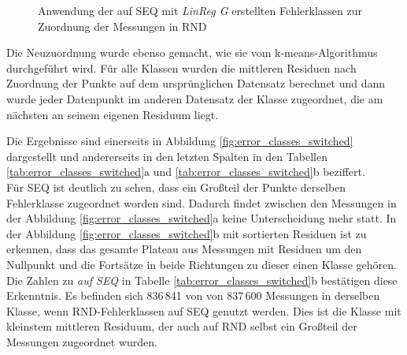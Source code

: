 \documentclass[
	12pt,
	a4paper,
	BCOR10mm,
	DIV14,
	listof=totoc,
	bibliography=totoc,
	headsepline
]{scrreprt}
\begin{document}
\begin{figure}
	\begin{center}
		\caption{Anwendung der auf SEQ mit \textit{LinReg G} erstellten Fehlerklassen zur Zuordnung der Messungen in RND}
		\label{fig:switched_classificators}
	\end{center}
\end{figure} 

Die Neuzuordnung wurde ebenso gemacht, wie sie vom k-means-Algorithmus durchgeführt wird.
Für alle Klassen wurden die mittleren Residuen nach Zuordnung der Punkte auf dem ursprünglichen Datensatz berechnet und dann wurde jeder Datenpunkt im anderen Datensatz der Klasse zugeordnet, die am nächsten an seinem eigenen Residuum liegt.\medskip

Die Ergebnisse sind einerseits in Abbildung \ref{fig:error_classes_switched} dargestellt und andererseits in den letzten Spalten in den Tabellen \ref{tab:error_classes_switched}a und \ref{tab:error_classes_switched}b beziffert.\\
Für SEQ ist deutlich zu sehen, dass ein Großteil der Punkte derselben Fehlerklasse zugeordnet worden sind. Dadurch findet zwischen den Messungen in der Abbildung \ref{fig:error_classes_switched}a keine Unterscheidung mehr statt.
In der Abbildung \ref{fig:error_classes_switched}b mit sortierten Residuen ist zu erkennen, dass das gesamte Plateau aus Messungen mit Residuen um den Nullpunkt und die Fortsätze in beide Richtungen zu dieser einen Klasse gehören.
Die Zahlen zu \textit{auf SEQ} in Tabelle \ref{tab:error_classes_switched}b bestätigen diese Erkenntnis.
Es befinden sich 836\,841 von von 837\,600 Messungen in derselben Klasse, wenn RND-Fehlerklassen auf SEQ genutzt werden.
Dies ist die Klasse mit kleinstem mittleren Residuum, der auch auf RND selbst ein Großteil der Messungen zugeordnet wurden.\medskip
\end{document}
